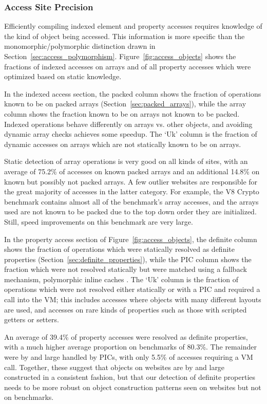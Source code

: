 \subsubsection{Access Site Precision}
\label{sec:access_objects}

Efficiently compiling indexed element and property accesses requires
knowledge of the kind of object being accessed.
This information is more specific than the monomorphic/polymorphic
distinction drawn in Section~\ref{sec:access_polymorphism}.
Figure~\ref{fig:access_objects} shows the fractions of indexed accesses on arrays
and of all property accesses which were optimized based on static knowledge.

In the indexed access section, the packed column shows the fraction
of operations known to be on packed arrays (Section~\ref{sec:packed_arrays}),
while the array column shows the fraction known to be on arrays not
known to be packed.
Indexed operations behave differently on arrays vs. other objects,
and avoiding dynamic array checks achieves some speedup.
The `Uk' column is the fraction of dynamic accesses on arrays which
are not statically known to be on arrays.

Static detection of array operations is very good on all kinds of sites,
with an average of 75.2\% of accesses on known packed arrays and
an additional 14.8\% on known but possibly not packed arrays.
A few outlier websites are responsible for the great majority of
accesses in the latter category.
For example, the V8 Crypto benchmark contains almost all of the benchmark's
array accesses, and the arrays used are not known to be packed
due to the top down order they are initialized.
Still, speed improvements on this benchmark are very large.

In the property access section of Figure~\ref{fig:access_objects},
the definite column shows the fraction
of operations which were statically resolved as definite properties
(Section~\ref{sec:definite_properties}), while the PIC column shows the fraction which
were not resolved statically but were matched using a fallback mechanism,
polymorphic inline caches \cite{XXX}.
The `Uk' column is the fraction of operations which were not resolved
either statically or with a PIC and required a call into the VM;
this includes accesses where objects
with many different layouts are used, and accesses on rare kinds of
properties such as those with scripted getters or setters.

An average of 39.4\% of property accesses were resolved as definite properties,
with a much higher average proportion on benchmarks of 80.3\%.
The remainder were by and large handled by PICs, with only 5.5\% of
accesses requiring a VM call.
Together, these suggest that objects on websites are by and large
constructed in a consistent fashion, but that
our detection of definite properties needs
to be more robust on object construction patterns seen on websites but
not on benchmarks.

